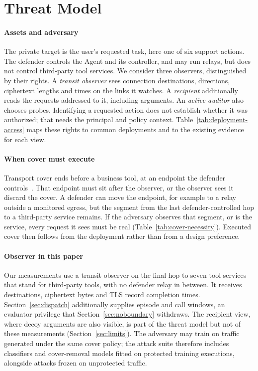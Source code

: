 \section{Threat Model}\label{sec:threat}
\paragraph{Assets and adversary}
The private target is the user's requested task, here one of six support actions. The defender controls the Agent and its controller, and may run relays, but does not control third-party tool services. We consider three observers, distinguished by their rights. A \emph{transit observer} sees connection destinations, directions, ciphertext lengths and times on the links it watches. A \emph{recipient} additionally reads the requests addressed to it, including arguments. An \emph{active auditor} also chooses probes. Identifying a requested action does not establish whether it was authorized; that needs the principal and policy context. Table~\ref{tab:deployment-access} maps these rights to common deployments and to the existing evidence for each view.



\paragraph{When cover must execute}
Transport cover ends before a business tool, at an endpoint the defender controls~\cite{apthorpe2019stp}. That endpoint must sit after the observer, or the observer sees it discard the cover. A defender can move the endpoint, for example to a relay outside a monitored egress, but the segment from the last defender-controlled hop to a third-party service remains. If the adversary observes that segment, or is the service, every request it sees must be real (Table~\ref{tab:cover-necessity}). Executed cover then follows from the deployment rather than from a design preference.



\paragraph{Observer in this paper}
Our measurements use a transit observer on the final hop to seven tool services that stand for third-party tools, with no defender relay in between. It receives destinations, ciphertext bytes and TLS record completion times. Section~\ref{sec:dispatch} additionally supplies episode and call windows, an evaluator privilege that Section~\ref{sec:noboundary} withdraws. The recipient view, where decoy arguments are also visible, is part of the threat model but not of these measurements (Section~\ref{sec:limits}). The adversary may train on traffic generated under the same cover policy; the attack suite therefore includes classifiers and cover-removal models fitted on protected training executions, alongside attacks frozen on unprotected traffic.
